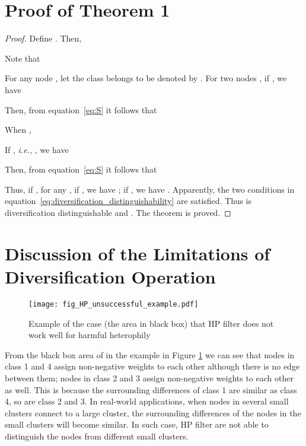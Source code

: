 \documentclass{article}
\newcommand\ie{\textit{i.e.,}}
\newcommand{\0}{{\boldsymbol{0}}}
\newcommand{\6}{{\partial}}
\newcommand{\8}{{\infty}}
\newcommand{\4}{{\nabla}}
\def\eqref#1{equation~\ref{#1}}
\begin{document}
\section{Proof of Theorem 1}
\label{appendix:proof_theorem2}
\begin{proof}
Define . 
Then,

Note that

For any node , let the class  belongs to be denoted by .
For two nodes , if , we have

Then, from \eqref{eq:S} it follows that

When ,  

If , \ie{} , we have

Then, from \eqref{eq:S} it follows that

Thus, if , for any , if , we have ; if , we have . Apparently, the two conditions in \eqref{eq:diversification_distinguishability} are satisfied.
Thus  is  diversification distinguishable and .
The theorem is proved.
\end{proof}



\section{Discussion of the Limitations of Diversification Operation}
\label{appendix:limitation_diversification}
\begin{figure}[htbp]
\centering
{
\captionsetup{justification = centering}
\texttt{[image: fig\_HP\_unsuccessful\_example.pdf]}}
{\caption{Example of the case (the area in black box) that HP filter does not work well for harmful heterophily}\label{fig:unsuccessful_example_hp_filter}
}
\end{figure}
From the black box area of  in the example in Figure \ref{fig:unsuccessful_example_hp_filter} we can see that nodes in class 1 and 4 assign non-negative weights to each other although there is no edge between them; nodes in class 2 and 3 assign non-negative weights to each other as well. This is because the surrounding differences of class 1 are similar as class 4, so are class 2 and 3. In real-world applications, when nodes in several small clusters connect to a large cluster, the surrounding differences of the nodes in the small clusters will become similar. In such case, HP filter are not able to distinguish the nodes from different small clusters. 
\end{document}
